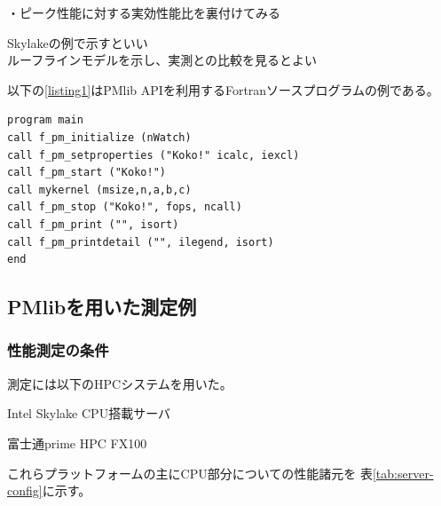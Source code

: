 \documentclass[submit,techrep,noauthor]{ipsj}
\begin{document}
・ピーク性能に対する実効性能比を裏付けてみる

{ \color{blue}
Skylakeの例で示すといい\\
ルーフラインモデルを示し、実測との比較を見るとよい\\
}

以下の\lstlistingname \ref{listing1}はPMlib APIを利用するFortranソースプログラムの例である。

\begin{lstlisting}[caption={\hfill},label={listing1},captionpos=t]
program main
call f_pm_initialize (nWatch)
call f_pm_setproperties ("Koko!" icalc, iexcl)
call f_pm_start ("Koko!")
call mykernel (msize,n,a,b,c)
call f_pm_stop ("Koko!", fops, ncall)
call f_pm_print ("", isort)
call f_pm_printdetail ("", ilegend, isort)
end
\end{lstlisting}

\subsection{PMlibを用いた測定例}

\subsubsection{性能測定の条件}

測定には以下のHPCシステムを用いた。
\begin{itemize}
{
\item Intel Skylake CPU搭載サーバ
\item 富士通prime HPC FX100
}
\end{itemize}

これらプラットフォームの主にCPU部分についての性能諸元を
表\ref{tab:server-config}に示す。
\end{document}

